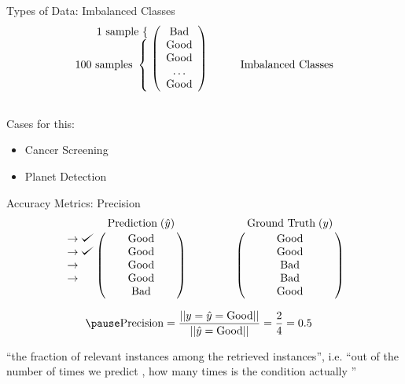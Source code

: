 \documentclass[usenames,dvipsnames]{beamer}
\begin{document}
\begin{frame}{Types of Data: Imbalanced Classes}
\[
  \begin{array}{@{} c @{}}
    \begin{array}{@{} r @{}}
      \text{1 sample}~\{\hspace{\nulldelimiterspace} \\
      \text{100 samples}~\left\{\begin{array}{@{}c@{}}\null\\\null\\\null\\\null\end{array}\right.
    \end{array}
    \left (
      \begin{array}{ *{1}{c} }
        \text{Bad}  \\
        \text{Good}  \\
        \text{Good}  \\
        \ldots  \\
        \text{Good}  \\
      \end{array}
    \right ) \\
    \mathstrut
  \end{array}
  \quad \quad \quad
  \text{Imbalanced Classes}
\]

\pause

Cases for this:
\begin{itemize}%
\item Cancer Screening
\item Planet Detection
\end{itemize}

\end{frame}

\begin{frame}{Accuracy Metrics: Precision}
$$
\bordermatrix{&\text{Prediction}\;(\hat{y})\cr
               \rightarrow\checkmark&\text{Good}\cr
               \rightarrow\checkmark&\text{Good}\cr
                \rightarrow&\text{Good}\cr
                \rightarrow&\text{Good}\cr
               &\text{Bad}}
\qquad \qquad
\bordermatrix{&\text{Ground Truth}\;(y)\cr
                &\text{Good}\cr
                &\text{Good}\cr
                &\text{Bad}\cr
                &\text{Bad}\cr
                &\text{Good}}
$$

\begin{align*}
\pause \text{Precision} &= \frac{||y = \hat{y} = \text{Good}||}{||\hat{y} = \text{Good}||} = \frac{2}{4} = 0.5
\end{align*}

``the fraction of relevant instances among the retrieved instances'', i.e. ``out of the number of times we predict , how many times is the condition actually ''

\end{frame}
\end{document}
